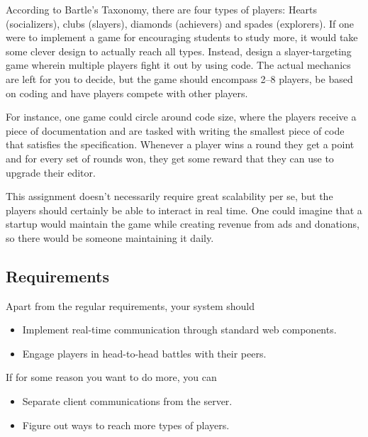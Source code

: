 \begin{refsection}
According to Bartle's Taxonomy\supercite{bartle}, there are four types of players: Hearts (socializers), clubs (slayers), diamonds (achievers) and spades (explorers). If one were to implement a game for encouraging students to study more, it would take some clever design to actually reach all types. Instead, design a slayer-targeting game wherein multiple players fight it out by using code. The actual mechanics are left for you to decide, but the game should encompass 2--8 players, be based on coding and have players compete with other players.

For instance, one game could circle around code size, where the players receive a piece of documentation and are tasked with writing the smallest piece of code that satisfies the specification. Whenever a player wins a round they get a point and for every set of rounds won, they get some reward that they can use to upgrade their editor.

This assignment doesn't necessarily require great scalability per se, but the players should certainly be able to interact in real time. One could imagine that a startup would maintain the game while creating revenue from ads and donations, so there would be someone maintaining it daily.

\subsection*{Requirements}
Apart from the regular requirements, your system should
\begin{itemize}
    \item Implement real-time communication through standard web components.
    \item Engage players in head-to-head battles with their peers.
\end{itemize}
If for some reason you want to do more, you can
\begin{itemize}
    \item Separate client communications from the server.
    \item Figure out ways to reach more types of players.
\end{itemize}


\printbibliography[heading=subbibliography]

\end{refsection}
